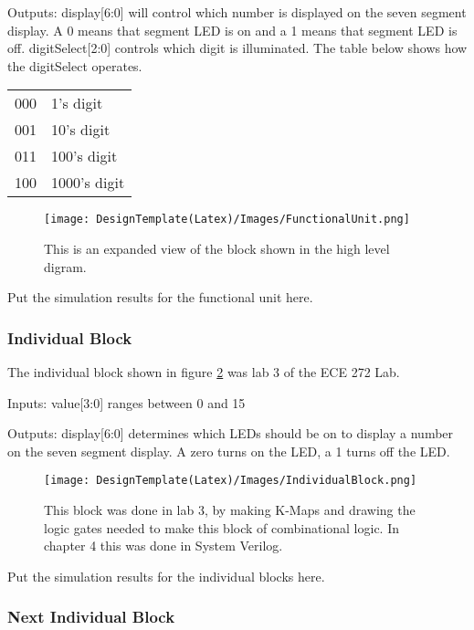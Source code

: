 \documentclass[a4paper]{article}
\begin{document}
Outputs:  display[6:0] will control which number is displayed on the seven segment display.  A 0 means that segment LED is on and a 1 means that segment LED is off.  digitSelect[2:0] controls which digit is illuminated.  The table below shows how the digitSelect operates.


\begin{center}
  \begin{tabular}{ c | l }
  \hline			
  000 & 1's digit \\
  001 & 10's digit \\
  011 & 100's digit \\
  100 & 1000's digit \\
  \hline  
  \end{tabular}
\end{center}

\begin{figure}[h]
  \centering
    \texttt{[image: DesignTemplate(Latex)/Images/FunctionalUnit.png]}
	\caption{This is an expanded view of the block shown in the high level digram.}
    \label{fig:FourDigSevenSegment}
\end{figure}

\vspace{.25 in}
Put the simulation results for the functional unit here.

\subsubsection{Individual Block}
The individual block shown in figure \ref{fig:IndBlock} was lab 3 of the ECE 272 Lab.

Inputs:  value[3:0] ranges between 0 and 15

Outputs:  display[6:0] determines which LEDs should be on to display a number on the seven segment display.  A zero turns on the LED, a 1 turns off the LED.

\begin{figure}[h]
  \centering
    \texttt{[image: DesignTemplate(Latex)/Images/IndividualBlock.png]}
	\caption{This block was done in lab 3, by making K-Maps and drawing the logic gates needed to make this block of combinational logic.  In chapter 4 this was done in System Verilog.}
    \label{fig:IndBlock}
\end{figure}
\vspace{.25 in}
Put the simulation results for the individual blocks here.

\subsubsection{Next Individual Block}
\end{document}
